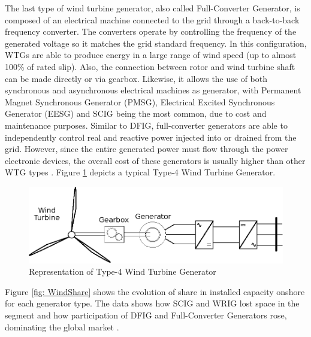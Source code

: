 The last type of wind turbine generator, also called Full-Converter Generator, is composed of an electrical machine connected to the grid through a back-to-back frequency converter. The converters operate by controlling the frequency of the generated voltage so it matches the grid standard frequency. In this configuration, WTGs are able to produce energy in a large range of wind speed (up to almost 100\% of rated slip). Also, the connection between rotor and wind turbine shaft can be made directly or via gearbox. Likewise, it allows the use of both synchronous and asynchronous electrical machines as generator, with Permanent Magnet Synchronous Generator (PMSG), Electrical Excited Synchronous Generator (EESG) and SCIG being the most common, due to cost and maintenance purposes. Similar to DFIG, full-converter generators are able to independently control real and reactive power injected into or drained from the grid. However, since the entire generated power must flow through the power electronic devices, the overall cost of these generators is usually higher than other WTG types \cite{Yaramasu2015}. Figure \ref{fig: WTG4} depicts a typical Type-4 Wind Turbine Generator.

\begin{figure}[h]
	\caption{Representation of Type-4 Wind Turbine Generator}
	\begin{center}
		\includegraphics[scale=.8]{Images/Type4WTG.eps}
	\end{center}
	\label{fig: WTG4}
\end{figure}

Figure \ref{fig: WindShare} shows the evolution of share in installed capacity onshore for each generator type. The data shows how SCIG and WRIG lost space in the segment and how participation of DFIG and Full-Converter Generators rose, dominating the global market \cite{Magagna2017}.

